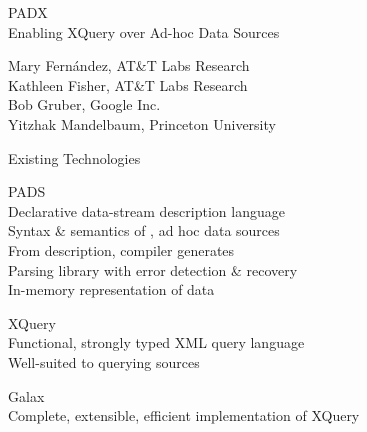 \documentclass[landscape]{slides}
\begin{document}

\begin{slide}
\begin{center}\Large\color{blue}
PADX\\Enabling XQuery over Ad-hoc Data Sources

\large\color{black}
\begin{center}
Mary Fern\'andez, AT\&T Labs Research\\
Kathleen Fisher, AT\&T Labs Research\\
Bob Gruber, Google Inc.\\
Yitzhak Mandelbaum, Princeton University
\end{center}
\end{center}
\end{slide}

\begin{Slide}{Existing Technologies}
  
  \vspace*{1cm}
  \bb PADS\\
  \bbb Declarative data-stream description language\\
  \bbb Syntax \& semantics of \emph{}, ad hoc data sources \\
  \bbb From description, compiler generates\\
  \bbbb Parsing library with error detection \& recovery\\
  \bbbb In-memory representation of data

  \bb XQuery\\
  \bbb Functional, strongly typed XML query language \\
  \bbb Well-suited to querying \emph{} sources

  \bb Galax\\
  \bbb Complete, extensible, efficient implementation of XQuery

\end{Slide}
\end{document}
